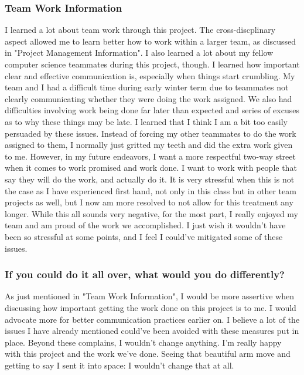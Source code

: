 \subsubsection{Team Work Information}
I learned a lot about team work through this project. The cross-discplinary aspect allowed me to learn better how to work within
a larger team, as discussed in "Project Management Information". I also learned a lot about my fellow computer science teammates during
this project, though. I learned how important clear and effective communication is, especially when things start crumbling.
My team and I had a difficult time during early winter term due to teammates not clearly communicating whether they were doing
the work assigned. We also had difficulties involving work being done far later than expected and series of excuses as to why these things
may be late. I learned that I think I am a bit too easily persuaded by these issues. Instead of forcing my other teammates to do the work
assigned to them, I normally just gritted my teeth and did the extra work given to me. However, in my future endeavors, I want a more
respectful two-way street when it comes to work promised and work done. I want to work with people that say they will do the work, and 
actually do it. It is very stressful when this is not the case as I have experienced first hand, not only in this class but in other
team projects as well, but I now am more resolved to not allow for this treatment any longer. While this all sounds very negative,
for the most part, I really enjoyed my team and am proud of the work we accomplished. I just wish it wouldn't have been so stressful
at some points, and I feel I could've mitigated some of these issues.

\subsubsection{If you could do it all over, what would you do differently?}
As just mentioned in "Team Work Information", I would be more assertive when discussing how important getting the work done on
this project is to me. I would advocate more for better communication practices earlier on. I believe a lot of the issues
I have already mentioned could've been avoided with these measures put in place. Beyond these complains, I wouldn't change anything.
I'm really happy with this project and the work we've done. Seeing that beautiful arm move and getting to say I sent it into space: I
wouldn't change that at all.


